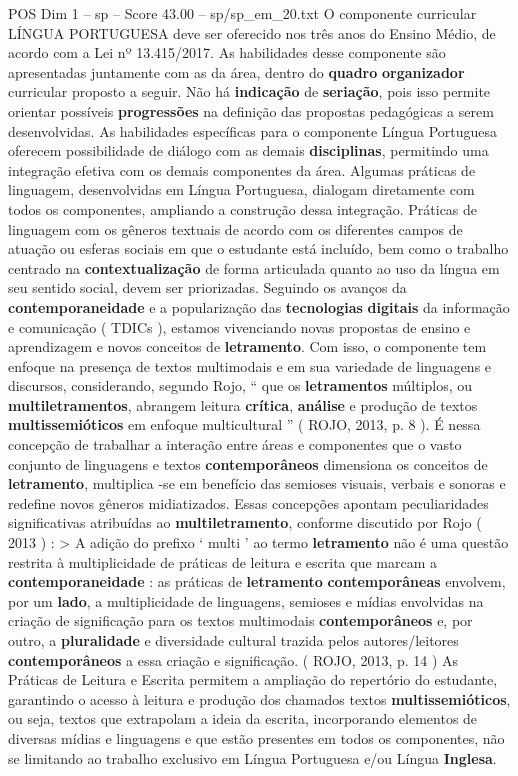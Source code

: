 \begin{textsample}{POS Dim 1 – sp – Score 43.00 – sp/sp\_em\_20.txt}  \label{ex:f1_pos_115}
O componente curricular LÍNGUA PORTUGUESA deve ser oferecido nos três anos do Ensino Médio, de acordo com a Lei nº 13.415/2017.
As habilidades desse componente são apresentadas juntamente com as da área, dentro do \textbf{quadro} \textbf{organizador} curricular proposto a seguir.
Não há \textbf{indicação} de \textbf{seriação}, pois isso permite orientar possíveis \textbf{progressões} na definição das propostas pedagógicas a serem desenvolvidas.
As habilidades específicas para o componente Língua Portuguesa oferecem possibilidade de diálogo com as demais \textbf{disciplinas}, permitindo uma integração efetiva com os demais componentes da área.
Algumas práticas de linguagem, desenvolvidas em Língua Portuguesa, dialogam diretamente com todos os componentes, ampliando a construção dessa integração.
Práticas de linguagem com os gêneros textuais de acordo com os diferentes campos de atuação ou esferas sociais em que o estudante está incluído, bem como o trabalho centrado na \textbf{contextualização} de forma articulada quanto ao uso da língua em seu sentido social, devem ser priorizadas.
Seguindo os avanços da \textbf{contemporaneidade} e a popularização das \textbf{tecnologias} \textbf{digitais} da informação e comunicação ( TDICs ), estamos vivenciando novas propostas de ensino e aprendizagem e novos conceitos de \textbf{letramento}.
Com isso, o componente tem enfoque na presença de textos multimodais e em sua variedade de linguagens e discursos, considerando, segundo Rojo, “ que os \textbf{letramentos} múltiplos, ou \textbf{multiletramentos}, abrangem leitura \textbf{crítica}, \textbf{análise} e produção de textos \textbf{multissemióticos} em enfoque multicultural ” ( ROJO, 2013, p. 8 ).
É nessa concepção de trabalhar a interação entre áreas e componentes que o vasto conjunto de linguagens e textos \textbf{contemporâneos} dimensiona os conceitos de \textbf{letramento}, multiplica -se em benefício das semioses visuais, verbais e sonoras e redefine novos gêneros midiatizados.
Essas concepções apontam peculiaridades significativas atribuídas ao \textbf{multiletramento}, conforme discutido por Rojo ( 2013 ) : > A adição do prefixo ‘ multi ’ ao termo \textbf{letramento} não é uma questão restrita à multiplicidade de práticas de leitura e escrita que marcam a \textbf{contemporaneidade} : as práticas de \textbf{letramento} \textbf{contemporâneas} envolvem, por um \textbf{lado}, a multiplicidade de linguagens, semioses e mídias envolvidas na criação de significação para os textos multimodais \textbf{contemporâneos} e, por outro, a \textbf{pluralidade} e diversidade cultural trazida pelos autores/leitores \textbf{contemporâneos} a essa criação e significação. ( ROJO, 2013, p. 14 ) As Práticas de Leitura e Escrita permitem a ampliação do repertório do estudante, garantindo o acesso à leitura e produção dos chamados textos \textbf{multissemióticos}, ou seja, textos que extrapolam a ideia da escrita, incorporando elementos de diversas mídias e linguagens e que estão presentes em todos os componentes, não se limitando ao trabalho exclusivo em Língua Portuguesa e/ou Língua \textbf{Inglesa}.

\end{textsample}
